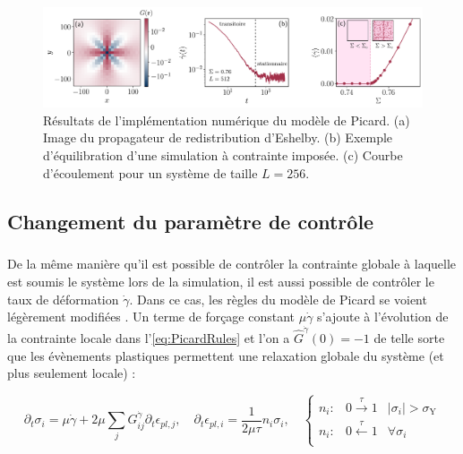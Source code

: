 \begin{figure}[h]
	\centering
	\includegraphics[width=\textwidth]{Chapitre4/Figures/Methode/ModeleResults.pdf}
	\caption{Résultats de l'implémentation numérique du modèle de Picard. (a) Image du propagateur de redistribution d'Eshelby. (b) Exemple d'équilibration d'une simulation à contrainte imposée. (c) Courbe d'écoulement pour un système de taille $L=256$.}
	\label{fig:resultsimplem}
\end{figure}

\subsection{Changement du paramètre de contrôle}

\label{sec:chgtcontrole}

\subparagraph{}De la même manière qu'il est possible de contrôler la contrainte globale à laquelle est soumis le système lors de la simulation, il est aussi possible de contrôler le taux de déformation $\dot{\gamma}$. Dans ce cas, les règles du modèle de Picard se voient légèrement modifiées \cite{picard_slow_2005}. Un terme de forçage  constant $\mu\dot{\gamma}$ s'ajoute à l'évolution de la contrainte locale dans l'\autoref{eq:PicardRules} et l'on a $\hat{G}^{\dot{\gamma}}(0) = -1$ de telle sorte que les évènements plastiques permettent une relaxation globale du système (et plus seulement locale) :

\begin{equation}
	\partial_t\sigma_i = \mu\dot{\gamma} + 2\mu\sum_{j}G^{\dot{\gamma}}_{ij}\partial_t \epsilon_{pl,j},\quad \partial_t \epsilon_{pl,i} = \frac{1}{2\mu\tau}n_i \sigma_i,\quad
	\left\{
    \begin{array}{lcc}
    n_i: & 0\xrightarrow{\tau}1 & |\sigma_i|>\sigma_\mathrm{Y} \\
    n_i: & 0\xleftarrow{\tau}1 & \forall \sigma_i\\
    \end{array}
    \right.
\end{equation}

